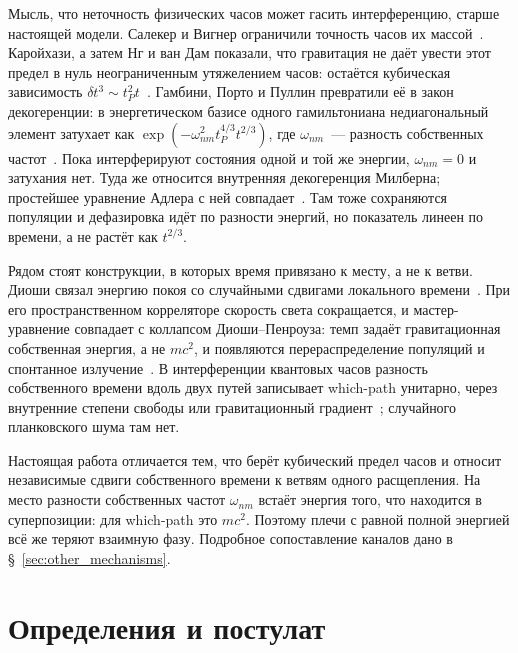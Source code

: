 \documentclass[12pt,a4paper]{article}
\begin{document}
Мысль, что неточность физических часов может гасить интерференцию, старше настоящей модели. Салекер и Вигнер ограничили точность часов их массой~\cite{saleckerwigner}. Каройхази, а затем Нг и ван Дам показали, что гравитация не даёт увести этот предел в нуль неограниченным утяжелением часов: остаётся кубическая зависимость $\delta t^3\sim t_P^2 t$~\cite{karolyhazy1966,ngvandam1995,ngvandam1994}. Гамбини, Порто и Пуллин превратили её в закон декогеренции: в энергетическом базисе одного гамильтониана недиагональный элемент затухает как $\exp(-\omega_{nm}^2 t_P^{4/3}t^{2/3})$, где $\omega_{nm}$~--- разность собственных частот~\cite{gambini2004,gambini2007}. Пока интерферируют состояния одной и той же энергии, $\omega_{nm}=0$ и затухания нет. Туда же относится внутренняя декогеренция Милберна; простейшее уравнение Адлера с ней совпадает~\cite{milburn1991,adler2004,diosi2005}. Там тоже сохраняются популяции и дефазировка идёт по разности энергий, но показатель линеен по времени, а не растёт как $t^{2/3}$.

Рядом стоят конструкции, в которых время привязано к месту, а не к ветви. Диоши связал энергию покоя со случайными сдвигами локального времени~\cite{diosi2005}. При его пространственном корреляторе скорость света сокращается, и мастер-уравнение совпадает с коллапсом Диоши--Пенроуза: темп задаёт гравитационная собственная энергия, а не $mc^2$, и появляются перераспределение популяций и спонтанное излучение~\cite{donadi2021}. В интерференции квантовых часов разность собственного времени вдоль двух путей записывает which-path унитарно, через внутренние степени свободы или гравитационный градиент~\cite{zych2011proper,pikovski2015}; случайного планковского шума там нет.

Настоящая работа отличается тем, что берёт кубический предел часов и относит независимые сдвиги собственного времени к ветвям одного расщепления. На место разности собственных частот $\omega_{nm}$ встаёт энергия того, что находится в суперпозиции: для which-path это $mc^2$. Поэтому плечи с равной полной энергией всё же теряют взаимную фазу. Подробное сопоставление каналов дано в \S~\ref{sec:other_mechanisms}.

\section{Определения и постулат}
\label{sec:postulates}
\end{document}
